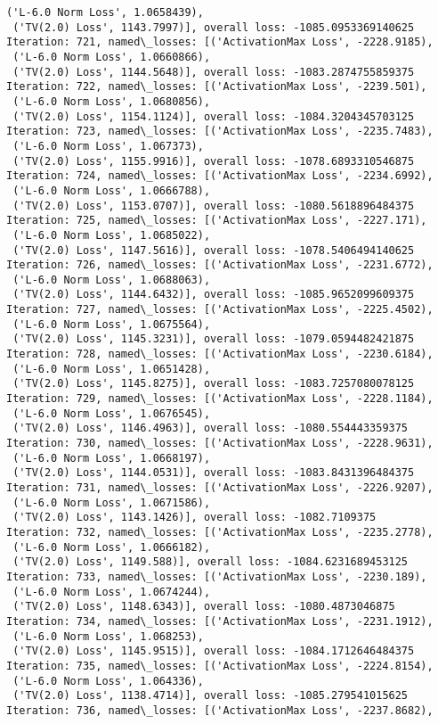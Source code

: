 \documentclass[10pt]{article}
\begin{document}
\begin{Verbatim}[commandchars=\\\{\}]
 ('L-6.0 Norm Loss', 1.0658439),
 ('TV(2.0) Loss', 1143.7997)], overall loss: -1085.0953369140625
Iteration: 721, named\_losses: [('ActivationMax Loss', -2228.9185),
 ('L-6.0 Norm Loss', 1.0660866),
 ('TV(2.0) Loss', 1144.5648)], overall loss: -1083.2874755859375
Iteration: 722, named\_losses: [('ActivationMax Loss', -2239.501),
 ('L-6.0 Norm Loss', 1.0680856),
 ('TV(2.0) Loss', 1154.1124)], overall loss: -1084.3204345703125
Iteration: 723, named\_losses: [('ActivationMax Loss', -2235.7483),
 ('L-6.0 Norm Loss', 1.067373),
 ('TV(2.0) Loss', 1155.9916)], overall loss: -1078.6893310546875
Iteration: 724, named\_losses: [('ActivationMax Loss', -2234.6992),
 ('L-6.0 Norm Loss', 1.0666788),
 ('TV(2.0) Loss', 1153.0707)], overall loss: -1080.5618896484375
Iteration: 725, named\_losses: [('ActivationMax Loss', -2227.171),
 ('L-6.0 Norm Loss', 1.0685022),
 ('TV(2.0) Loss', 1147.5616)], overall loss: -1078.5406494140625
Iteration: 726, named\_losses: [('ActivationMax Loss', -2231.6772),
 ('L-6.0 Norm Loss', 1.0688063),
 ('TV(2.0) Loss', 1144.6432)], overall loss: -1085.9652099609375
Iteration: 727, named\_losses: [('ActivationMax Loss', -2225.4502),
 ('L-6.0 Norm Loss', 1.0675564),
 ('TV(2.0) Loss', 1145.3231)], overall loss: -1079.0594482421875
Iteration: 728, named\_losses: [('ActivationMax Loss', -2230.6184),
 ('L-6.0 Norm Loss', 1.0651428),
 ('TV(2.0) Loss', 1145.8275)], overall loss: -1083.7257080078125
Iteration: 729, named\_losses: [('ActivationMax Loss', -2228.1184),
 ('L-6.0 Norm Loss', 1.0676545),
 ('TV(2.0) Loss', 1146.4963)], overall loss: -1080.554443359375
Iteration: 730, named\_losses: [('ActivationMax Loss', -2228.9631),
 ('L-6.0 Norm Loss', 1.0668197),
 ('TV(2.0) Loss', 1144.0531)], overall loss: -1083.8431396484375
Iteration: 731, named\_losses: [('ActivationMax Loss', -2226.9207),
 ('L-6.0 Norm Loss', 1.0671586),
 ('TV(2.0) Loss', 1143.1426)], overall loss: -1082.7109375
Iteration: 732, named\_losses: [('ActivationMax Loss', -2235.2778),
 ('L-6.0 Norm Loss', 1.0666182),
 ('TV(2.0) Loss', 1149.588)], overall loss: -1084.6231689453125
Iteration: 733, named\_losses: [('ActivationMax Loss', -2230.189),
 ('L-6.0 Norm Loss', 1.0674244),
 ('TV(2.0) Loss', 1148.6343)], overall loss: -1080.4873046875
Iteration: 734, named\_losses: [('ActivationMax Loss', -2231.1912),
 ('L-6.0 Norm Loss', 1.068253),
 ('TV(2.0) Loss', 1145.9515)], overall loss: -1084.1712646484375
Iteration: 735, named\_losses: [('ActivationMax Loss', -2224.8154),
 ('L-6.0 Norm Loss', 1.064336),
 ('TV(2.0) Loss', 1138.4714)], overall loss: -1085.279541015625
Iteration: 736, named\_losses: [('ActivationMax Loss', -2237.8682),

\end{Verbatim}
\end{document}
